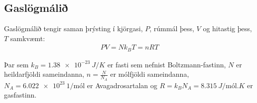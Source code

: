 \ifdefined \wholebook \else\documentclass[oneside]{book}\usepackage{EdlBook}\graphicspath{{figures/}}
\begin{document}
\newpage

\subsection*{Gaslögmálið}

\begin{tcolorbox}
Gaslögmálið tengir saman þrýsting í kjörgasi, $P$, rúmmál þess, $V$ og hitastig þess, $T$ samkvæmt:
\begin{align*}
    PV = Nk_B T = nR T
\end{align*}

\vspace{-0.25cm}

Þar sem $k_B = \SI{1.38e-23}{J/K}$ er fasti sem nefnist Boltzmann-fastinn,
$N$ er heildarfjöldi sameindanna,
$n = \frac{N}{N_A}$ er mólfjöldi sameindanna, $N_A = \SI{6.022e23}{1/\text{mól}}$
er Avagadrosartalan og $R = k_B N_A = \SI{8.315}{J/\text{mól}.K}$ er gasfastinn.
\end{tcolorbox}
\end{document}
